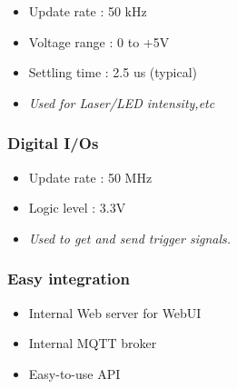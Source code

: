 \documentclass[a4paper]{article}
\providecommand{\tightlist}{\setlength{\itemsep}{0pt}\setlength{\parskip}{0pt}}
\begin{document}
\begin{multicols}{2}
\begin{itemize}
\tightlist
\item
  Update rate : 50 kHz
\item
  Voltage range : 0 to +5V
\item
  Settling time : 2.5 us (typical)
\item
  \textit{Used for Laser/LED intensity,etc}
\end{itemize}

\hypertarget{digital-i-o-s}{%
\subsubsection{ Digital I/Os}\label{digital-i-o-s}}
\begin{itemize}
\tightlist
\item
  Update rate : 50 MHz
\item
  Logic level : 3.3V
\item
  \textit{Used to get and send trigger signals.}
\end{itemize}

\hypertarget{easy-integration}{%
\subsubsection{Easy integration}\label{easy-integration}}

\begin{itemize}
\tightlist
\item
  Internal Web server for WebUI
\item
  Internal MQTT broker
\item
  Easy-to-use API
\end{itemize}

\end{multicols}
\end{document}
